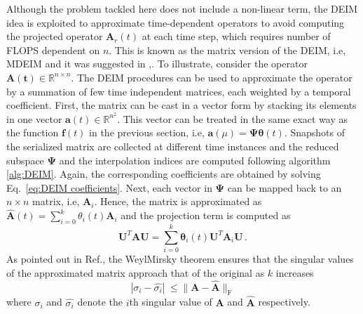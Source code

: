 \documentclass[review,number,sort&compress,12pt]{elsarticle}
\begin{document}
Although the problem tackled here does not include a non-linear term, the DEIM idea is exploited to approximate time-dependent operators to avoid computing the projected operator $\mathbf{A}_r(t)$ at each time step, which requires number of FLOPS dependent on $n$.
This is known as the matrix version of the DEIM, i.e, MDEIM and it was suggested in \cite{carlberg2012efficient},\cite{benner2015survey}.
To illustrate, consider the operator $\mathbf{A}(\boldsymbol{t}) \in \mathbb{R}^{n\times n}$.
The DEIM procedures can be used to approximate the operator by a summation of few time independent matrices, each weighted by a temporal coefficient.
First, the matrix can be cast in a vector form by stacking its elements in one vector $\mathbf{a}(t) \in \mathbb{R}^{n^2}$.
This vector can be treated in the same exact way as the function $\mathbf{f}(t)$ in the previous section, i.e, $\mathbf{a}(\mu) = \mathbf{\Psi}\boldsymbol{\theta}(t)$.
Snapshots of the serialized matrix are collected at different time instances and the reduced subspace $\mathbf{\Psi}$ and the interpolation indices are computed following algorithm \ref{alg:DEIM}.
Again, the corresponding coefficients are obtained by solving Eq.~\ref{eq:DEIM coefficients}. 
Next, each vector in $\mathbf{\Psi}$ can be mapped back to an $n \times n$ matrix, i.e, $\textbf{A}_i$.
Hence, the matrix is approximated as $\mathbf{\hat{A}}(t)=\sum_{i=0}^k \theta_i(t) \mathbf{A}_i$ and the projection term is computed as
\begin{equation}
\mathbf{U}^T\mathbf{A}\mathbf{U} = \sum_{i=0}^k \mathbf{\theta}_i(t)\mathbf{U}^T\mathbf{A}_i\mathbf{U} \, .
\label{Eq:deim matrix projection}
\end{equation}
As pointed out in Ref.\cite{negri2015efficient}, the Weyl\textendash Mirsky theorem \cite{weyl1912asymptotische} ensures that the singular values of the approximated matrix approach that of the original as $k$ increases 
\begin{equation}
|\sigma_i - \hat{\sigma_i}  |\ \le \|\mathbf{A} - \hat{\mathbf{A}}\|_\text{F}
\end{equation}
where $\sigma_i$ and $\hat{\sigma_i}$ denote the $i$th singular value of $\mathbf{A}$ and $\hat{\mathbf{A}}$ respectively.
\end{document}
